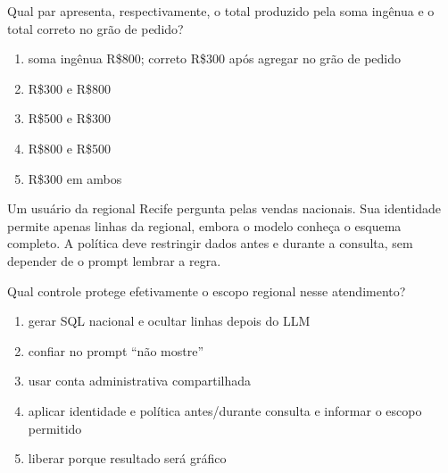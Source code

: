 \FonteDidatica

\Comando Qual par apresenta, respectivamente, o total produzido pela soma ingênua e o total correto no grão de pedido?

\begin{enumerate}[label=\Alph*)]

\item soma ingênua R\$800; correto R\$300 após agregar no grão de pedido

\item R\$300 e R\$800

\item R\$500 e R\$300

\item R\$800 e R\$500

\item R\$300 em ambos

\end{enumerate}


\TextoBase

Um usuário da regional Recife pergunta pelas vendas nacionais. Sua identidade permite apenas linhas da regional, embora o modelo conheça o esquema completo. A política deve restringir dados antes e durante a consulta, sem depender de o prompt lembrar a regra.

\FonteDidatica

\Comando Qual controle protege efetivamente o escopo regional nesse atendimento?

\begin{enumerate}[label=\Alph*)]

\item gerar SQL nacional e ocultar linhas depois do LLM

\item confiar no prompt ``não mostre''

\item usar conta administrativa compartilhada

\item aplicar identidade e política antes/durante consulta e informar o escopo permitido

\item liberar porque resultado será gráfico

\end{enumerate}


